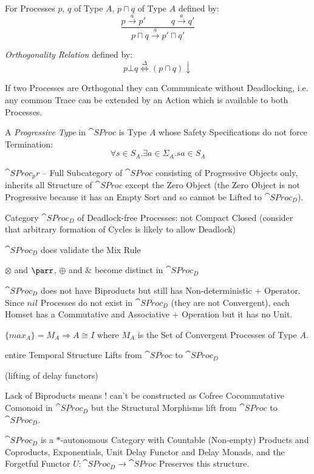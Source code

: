For Processes $p$, $q$ of Type $A$, $p \sqcap q$ of Type $A$ defined
by:
\[
  \frac{p \xrightarrow{a} p' \quad\quad\quad q \xrightarrow{a} q'}
  {p \sqcap q \xrightarrow{a} p' \sqcap q'}
\]

\emph{Orthogonality Relation} defined by:
\[
  p \bot q \stackrel{\Delta}{\Leftrightarrow} (p \sqcap q) \downarrow
\]

If two Processes are Orthogonal they can Communicate without
Deadlocking, i.e. any common Trace can be extended by an Action which
is available to both Processes.

A \emph{Progressive Type} in $\cat{SProc}$ is Type $A$ whose Safety
Specifications do not force Termination:
\[
  \forall s \in S_A . \exists a \in \Sigma_A.sa \in S_A
\]

$\cat{SProc}_pr$ -- Full Subcategory of $\cat{SProc}$ consisting of
Progressive Objects only, inherits all Structure of $\cat{SProc}$
except the Zero Object (the Zero Object is not Progressive because it
has an Empty Sort and so cannot be Lifted to $\cat{SProc}_D$).

Category $\cat{SProc}_D$ of Deadlock-free Processes: not Compact
Closed (consider that arbitrary formation of Cycles is likely to allow
Deadlock) %

$\cat{SProc}_D$ does validate the Mix Rule %

$\otimes$ and $\parr$, $\oplus$ and $\&$ become distinct in
$\cat{SProc}_D$ %

$\cat{SProc}_D$ does not have Biproducts but still has
Non-deterministic $+$ Operator. Since $nil$ Processes do not exist in
$\cat{SProc}_D$ (they are not Convergent), each Homset has a
Commutative and Associative $+$ Operation but it has no Unit.

$\{max_A\} = M_A \Rightarrow A \cong I$ where $M_A$ is the Set of
Convergent Processes of Type $A$. %

entire Temporal Structure Lifts from $\cat{SProc}$ to $\cat{SProc}_D$

(lifting of delay functors) %

Lack of Biproducts means $!$ can't be constructed as Cofree
Cocommutative Comonoid in $\cat{SProc}_D$ but the Structural Morphisms
lift from $\cat{SProc}$ to $\cat{SProc}_D$. %

$\cat{SProc}_D$ is a $*$-autonomous Category with Countable
(Non-empty) Products and Coproducts, Exponentials, Unit Delay Functor
and Delay Monads, and the Forgetful Functor $U : \cat{SProc}_D
\rightarrow \cat{SProc}$ Preserves this structure.

